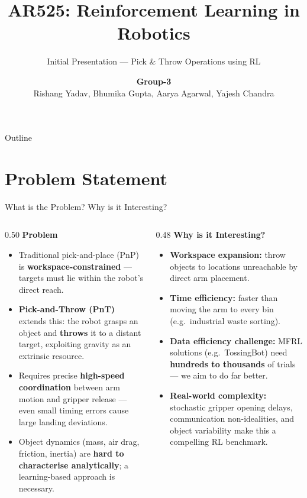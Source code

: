 \documentclass{if-beamer}
\title[Initial Presentation]{\Huge\textbf{AR525: Reinforcement Learning in Robotics}}
\subtitle{\Large{Initial Presentation --- Pick \& Throw Operations using RL}}
\author[]{
    \large \textbf{Group-3} \\[0.5em]
    \small Rishang Yadav, Bhumika Gupta, Aarya Agarwal, Yajesh Chandra\newline\newline
}
\institute[Indian Institute of Technology (IIT) Mandi]{
}
\begin{document}
\begin{frame}
  \titlepage
\end{frame}

\begin{frame}{Outline}
  \tableofcontents
\end{frame}


\section{Problem Statement}

\begin{frame}{What is the Problem? Why is it Interesting?}
    \begin{columns}[T]
        \begin{column}{0.50\textwidth}
            \textbf{Problem}
            \begin{itemize}
                \item Traditional pick-and-place (PnP) is \textbf{workspace-constrained} --- targets must lie within the robot's direct reach.
                \item \textbf{Pick-and-Throw (PnT)} extends this: the robot grasps an object and \textbf{throws} it to a distant target, exploiting gravity as an extrinsic resource.
                \item Requires precise \textbf{high-speed coordination} between arm motion and gripper release --- even small timing errors cause large landing deviations.
                \item Object dynamics (mass, air drag, friction, inertia) are \textbf{hard to characterise analytically}; a learning-based approach is necessary.
            \end{itemize}
        \end{column}
        \begin{column}{0.48\textwidth}
            \textbf{Why is it Interesting?}
            \begin{itemize}
                \item \textbf{Workspace expansion:} throw objects to locations unreachable by direct arm placement.
                \item \textbf{Time efficiency:} faster than moving the arm to every bin (e.g.\ industrial waste sorting).
                \item \textbf{Data efficiency challenge:} MFRL solutions (e.g.\ TossingBot) need \textbf{hundreds to thousands} of trials --- we aim to do far better.
                \item \textbf{Real-world complexity:} stochastic gripper opening delays, communication non-idealities, and object variability make this a compelling RL benchmark.
            \end{itemize}
        \end{column}
    \end{columns}
\end{frame}
\end{document}
